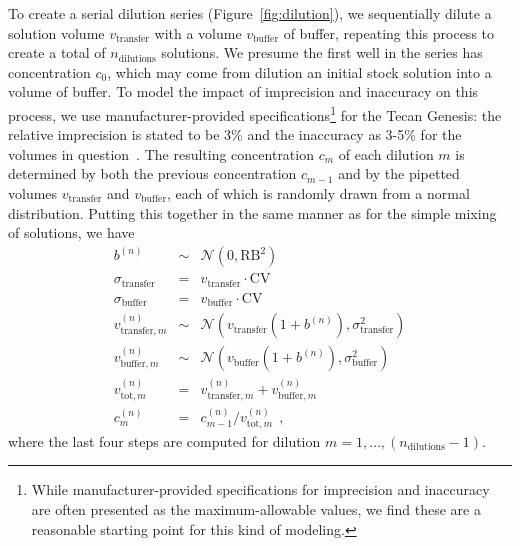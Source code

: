 \documentclass[aps,pre,twocolumn,nofootinbib,superscriptaddress,linenumbers]{revtex4-1}
\begin{document}
To create a serial dilution series (Figure~\ref{fig:dilution}), we sequentially dilute a solution volume $v_\mathrm{transfer}$ with a volume $v_\mathrm{buffer}$ of buffer, repeating this process to create a total of $n_\mathrm{dilutions}$ solutions. 
We presume the first well in the series has concentration $c_0$, which may come from dilution an initial stock solution into a volume of buffer.
To model the impact of imprecision and inaccuracy on this process, we use manufacturer-provided specifications\footnote{While manufacturer-provided specifications for imprecision and inaccuracy are often presented as the maximum-allowable values, we find these are a reasonable starting point for this kind of modeling.} for the Tecan Genesis: the relative imprecision is stated to be 3\% and the inaccuracy as 3-5\% for the volumes in question~\cite{_tecan_2001}. 
The resulting concentration $c_m$ of each dilution $m$ is determined by both the previous concentration $c_{m-1}$  and by the pipetted volumes $v_\mathrm{transfer}$ and $v_\mathrm{buffer}$, each of which is randomly drawn from a normal distribution.
Putting this together in the same manner as for the simple mixing of solutions, we have
\begin{eqnarray}
b^{(n)} &\sim& \mathcal{N}(0, \mathrm{RB}^2) \nonumber \\
\sigma_\mathrm{transfer} &=& v_\mathrm{transfer} \cdot \mathrm{CV} \nonumber \\
\sigma_\mathrm{buffer} &=& v_\mathrm{buffer} \cdot \mathrm{CV} \nonumber \\
v_{\mathrm{transfer},m}^{(n)} &\sim& \mathcal{N}(v_\mathrm{transfer} (1 + b^{(n)}) , \sigma_\mathrm{transfer}^2) \nonumber \\
v_{\mathrm{buffer},m}^{(n)} &\sim& \mathcal{N}(v_\mathrm{buffer} (1 + b^{(n)}), \sigma_\mathrm{buffer}^2) \nonumber \\
v_{\mathrm{tot}, m}^{(n)} &=& v_{\mathrm{transfer}, m}^{(n)} + v_{\mathrm{buffer}, m}^{(n)} \nonumber \\
c_m^{(n)} &=& c_{m-1}^{(n)} / v_{\mathrm{tot}, m}^{(n)} \:\: , \label{equation:stock-concentration-uncertainty-simple}
\end{eqnarray}
where the last four steps are computed for dilution $m = 1, \ldots, (n_\mathrm{dilutions}-1)$.
\end{document}
